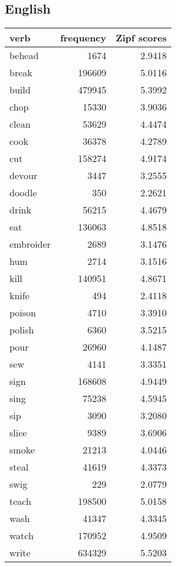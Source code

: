 \subsection{English}

\begin{longtable}{l|rr}
\textbf{verb}      & \textbf{frequency}    & \textbf{Zipf scores}    \\
\hline
\endhead
behead    & 1674      & 2.9418     \\
break     & 196609    & 5.0116     \\
build     & 479945    & 5.3992     \\
chop      & 15330     & 3.9036     \\
clean     & 53629     & 4.4474     \\
cook      & 36378     & 4.2789     \\
cut       & 158274    & 4.9174     \\
devour    & 3447      & 3.2555     \\
doodle    & 350       & 2.2621     \\
drink     & 56215     & 4.4679     \\
eat       & 136063    & 4.8518     \\
embroider & 2689      & 3.1476     \\
hum       & 2714      & 3.1516     \\
kill      & 140951    & 4.8671     \\
knife     & 494       & 2.4118     \\
poison    & 4710      & 3.3910     \\
polish    & 6360      & 3.5215     \\
pour      & 26960     & 4.1487     \\
sew       & 4141      & 3.3351     \\
sign      & 168608    & 4.9449     \\
sing      & 75238     & 4.5945     \\
sip       & 3090      & 3.2080     \\
slice     & 9389      & 3.6906     \\
smoke     & 21213     & 4.0446     \\
steal     & 41619     & 4.3373     \\
swig      & 229       & 2.0779     \\
teach     & 198500    & 5.0158     \\
wash      & 41347     & 4.3345     \\
watch     & 170952    & 4.9509     \\
write     & 634329    & 5.5203    
\end{longtable}

